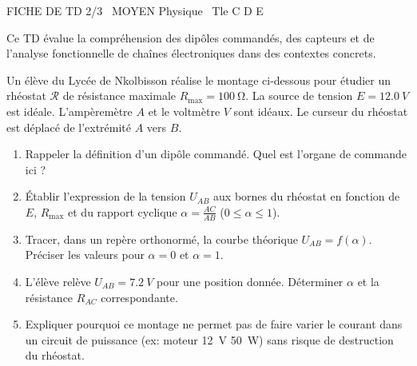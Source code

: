 \documentclass[11pt]{article}
\begin{document}
\begin{tcolorbox}[enhanced,colback=popink,colframe=popink,arc=10pt,boxrule=0pt,left=12pt,right=12pt,top=9pt,bottom=9pt]
{\color{white}\popxbold\small FICHE DE TD 2/3 \textbullet\ MOYEN \hfill Physique \textbullet\ Tle C D E\par}
\end{tcolorbox}
\vspace{4pt}
Ce TD évalue la compréhension des dipôles commandés, des capteurs et de l'analyse fonctionnelle de chaînes électroniques dans des contextes concrets.

\begin{exercice}
Un élève du Lycée de Nkolbisson réalise le montage ci-dessous pour étudier un rhéostat $\mathcal{R}$ de résistance maximale $R_{\text{max}} = \SI{100}{\ohm}$. La source de tension $E = \SI{12,0}{V}$ est idéale. L'ampèremètre $A$ et le voltmètre $V$ sont idéaux. Le curseur du rhéostat est déplacé de l'extrémité $A$ vers $B$.
\begin{enumerate}
    \item Rappeler la définition d'un dipôle commandé. Quel est l'organe de commande ici ?
    \item Établir l'expression de la tension $U_{AB}$ aux bornes du rhéostat en fonction de $E$, $R_{\text{max}}$ et du rapport cyclique $\alpha = \frac{AC}{AB}$ ($0 \le \alpha \le 1$).
    \item Tracer, dans un repère orthonormé, la courbe théorique $U_{AB} = f(\alpha)$. Préciser les valeurs pour $\alpha = 0$ et $\alpha = 1$.
    \item L'élève relève $U_{AB} = \SI{7,2}{V}$ pour une position donnée. Déterminer $\alpha$ et la résistance $R_{AC}$ correspondante.
    \item Expliquer pourquoi ce montage ne permet pas de faire varier le courant dans un circuit de puissance (ex: moteur \SI{12}{V} \SI{50}{W}) sans risque de destruction du rhéostat.
\end{enumerate}
\end{exercice}
\end{document}
